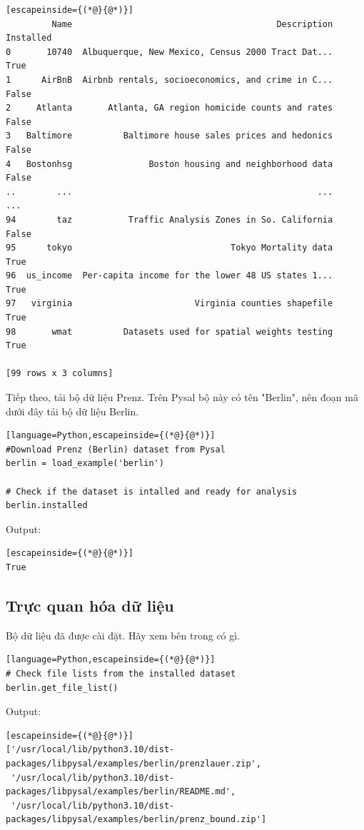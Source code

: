 \begin{lstlisting}[escapeinside={(*@}{@*)}]
         Name                                        Description  Installed
0       10740  Albuquerque, New Mexico, Census 2000 Tract Dat...       True
1      AirBnB  Airbnb rentals, socioeconomics, and crime in C...      False
2     Atlanta       Atlanta, GA region homicide counts and rates      False
3   Baltimore          Baltimore house sales prices and hedonics      False
4   Bostonhsg               Boston housing and neighborhood data      False
..        ...                                                ...        ...
94        taz           Traffic Analysis Zones in So. California      False
95      tokyo                               Tokyo Mortality data       True
96  us_income  Per-capita income for the lower 48 US states 1...       True
97   virginia                        Virginia counties shapefile       True
98       wmat          Datasets used for spatial weights testing       True

[99 rows x 3 columns]
\end{lstlisting}

Tiếp theo, tải bộ dữ liệu Prenz. Trên Pysal bộ này có tên "Berlin", nên đoạn mã dưới đây tải bộ dữ liệu Berlin.

\begin{lstlisting}[language=Python,escapeinside={(*@}{@*)}]
#Download Prenz (Berlin) dataset from Pysal
berlin = load_example('berlin')

# Check if the dataset is intalled and ready for analysis
berlin.installed
\end{lstlisting}

Output:

\begin{lstlisting}[escapeinside={(*@}{@*)}]
True
\end{lstlisting}

\subsection{Trực quan hóa dữ liệu}

Bộ dữ liệu đã được cài đặt. Hãy xem bên trong có gì.

\begin{lstlisting}[language=Python,escapeinside={(*@}{@*)}]
# Check file lists from the installed dataset
berlin.get_file_list()
\end{lstlisting}

Output:

\begin{lstlisting}[escapeinside={(*@}{@*)}]
['/usr/local/lib/python3.10/dist-packages/libpysal/examples/berlin/prenzlauer.zip',
 '/usr/local/lib/python3.10/dist-packages/libpysal/examples/berlin/README.md',
 '/usr/local/lib/python3.10/dist-packages/libpysal/examples/berlin/prenz_bound.zip']
\end{lstlisting}

